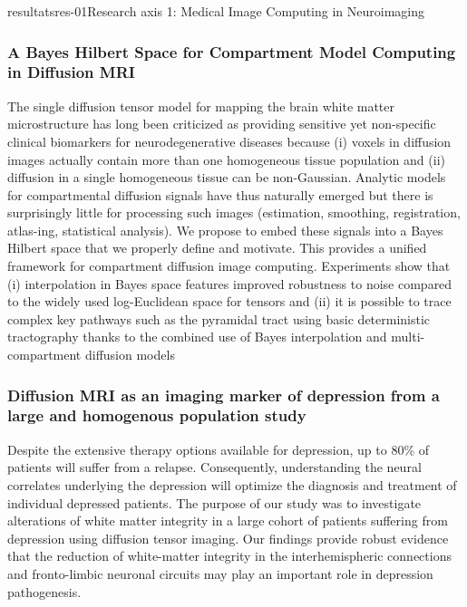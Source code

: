 \documentclass{ra2018}
\begin{document}
\begin{module}{resultats}{res-01}{Research axis 1: Medical Image Computing in Neuroimaging}
\subsubsection{A Bayes Hilbert Space for Compartment Model Computing in Diffusion MRI}
\begin{participants}
\end{participants}
The single diffusion tensor model for mapping the brain white matter microstructure has long been criticized as providing sensitive yet non-specific clinical biomarkers for neurodegenerative diseases because (i) voxels in diffusion images actually contain more than one homogeneous tissue population and (ii) diffusion in a single homogeneous tissue can be non-Gaussian. Analytic models for compartmental diffusion signals have thus naturally emerged but there is surprisingly little for processing such images (estimation, smoothing, registration, atlas-ing, statistical analysis). We propose to embed these signals into a Bayes Hilbert space that we properly define and motivate. This provides a unified framework for compartment diffusion image computing. Experiments show that (i) interpolation in Bayes space features improved robustness to noise compared to the widely used log-Euclidean space for tensors and (ii) it is possible to trace complex key pathways such as the pyramidal tract using basic deterministic tractography thanks to the combined use of Bayes interpolation and multi-compartment diffusion models~\cite{stamm:inserm-01937992}

\subsubsection{Diffusion MRI as an imaging marker of depression from a large and homogenous population study}
\begin{participants}
\end{participants}
Despite the extensive therapy options available for depression, up to 80\% of patients will suffer from a relapse. Consequently, understanding the neural correlates underlying the depression will optimize the diagnosis and treatment of individual depressed patients. The purpose of our study was to investigate alterations of white matter integrity in a large cohort of patients suffering from depression using diffusion tensor imaging. Our findings provide robust evidence that the reduction of white-matter integrity in the interhemispheric connections and fronto-limbic neuronal circuits may play an important role in depression pathogenesis.~\cite{coloigner:hal-01812093}


\end{module}
\end{document}
